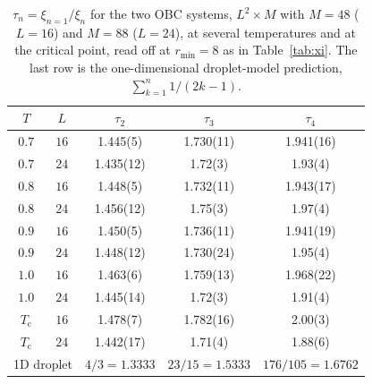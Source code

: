 \begin{table}[b]
    \centering
    \begin{ruledtabular}
    \begin{tabular}{ccccc}
        $T$ & $L$ & $\tau_{2}$ & $\tau_{3}$ & $\tau_{4}$ \\\hline
         $0.7$ & $16$ & 1.445(5) & 1.730(11) & 1.941(16)\\
         $0.7$ & $24$ & 1.435(12) & 1.72(3) & 1.93(4)\\
         $0.8$ & $16$ & 1.448(5) & 1.732(11) & 1.943(17)\\
         $0.8$ & $24$ & 1.456(12) & 1.75(3) & 1.97(4)\\
         $0.9$ & $16$ & 1.450(5) & 1.736(11) & 1.941(19)\\
         $0.9$ & $24$ & 1.448(12) & 1.730(24) & 1.95(4)\\
         $1.0$ & $16$ & 1.463(6) & 1.759(13) & 1.968(22)\\
         $1.0$ & $24$ & 1.445(14) & 1.72(3) & 1.91(4)\\
         $T_\mathrm{c}$ & $16$ & 1.478(7) & 1.782(16) & 2.00(3)\\
         $T_\mathrm{c}$ & $24$ & 1.442(17) & 1.71(4) & 1.88(6)\\\hline
         \multicolumn{2}{c}{1D droplet} & $4/3 = 1.3333$ & $23/15 = 1.5333$ & $176/105 = 1.6762$\\
   \end{tabular}
    \end{ruledtabular}
    \caption{$\tau_n=\xi_{n=1}/\xi_n$ for the two OBC systems, $L^2\times M$ with $M=48$ ($L=16$) and $M=88$ ($L=24$), at several temperatures and at the critical point, read off at $r_\mathrm{min}=8$ as in Table~\ref{tab:xi}. The last row is the one-dimensional droplet-model prediction, $\sum_{k=1}^{n}1/(2k-1)$.}
    \label{tab:tau}
\end{table}
